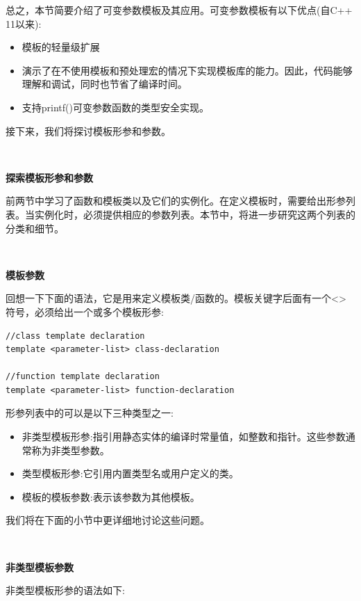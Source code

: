 总之，本节简要介绍了可变参数模板及其应用。可变参数模板有以下优点(自C++ 11以来): \par

\begin{itemize}
	\item 模板的轻量级扩展
	\item 演示了在不使用模板和预处理宏的情况下实现模板库的能力。因此，代码能够理解和调试，同时也节省了编译时间。
	\item 支持printf()可变参数函数的类型安全实现。
\end{itemize}

接下来，我们将探讨模板形参和参数。\par

\noindent\textbf{}\ \par
\textbf{探索模板形参和参数} \ \par
前两节中学习了函数和模板类以及它们的实例化。在定义模板时，需要给出形参列表。当实例化时，必须提供相应的参数列表。本节中，将进一步研究这两个列表的分类和细节。 \par

\noindent\textbf{}\ \par
\textbf{模板参数} \ \par
回想一下下面的语法，它是用来定义模板类/函数的。模板关键字后面有一个<>符号，必须给出一个或多个模板形参: \par

\begin{lstlisting}[caption={}]
//class template declaration
template <parameter-list> class-declaration

//function template declaration
template <parameter-list> function-declaration
\end{lstlisting}

形参列表中的可以是以下三种类型之一: \par

\begin{itemize}
	\item 非类型模板形参:指引用静态实体的编译时常量值，如整数和指针。这些参数通常称为非类型参数。 
	\item 类型模板形参:它引用内置类型名或用户定义的类。
	\item 模板的模板参数:表示该参数为其他模板。
\end{itemize}

我们将在下面的小节中更详细地讨论这些问题。 \par

\noindent\textbf{}\ \par
\textbf{非类型模板参数} \ \par
非类型模板形参的语法如下: \par

